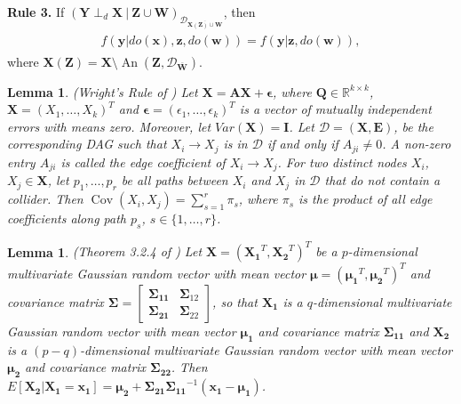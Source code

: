 \documentclass[twoside]{article}
\newtheorem{lemma}[theorem]{Lemma}
\DeclareMathOperator{\Cov}{Cov}
\DeclareMathOperator{\An}{An}
\newcommand\given[1][]{\:#1\vert\:}
\newcommand{\mb}[1]{\mathbf{#1}}
\newcommand{\dsepp}{\perp_{d}}
\newcommand{\g}[1][G]{\mathcal{#1}}
\begin{document}
\textbf{Rule 3.} If $(\mb{Y} \dsepp \mb{X} \given \mb{Z} \cup \mb{W})_{\g[D]_{\overline{\mb{X}(\mb{Z}) \cup \mb{W}}}}$, then
    \begin{align}
        \begin{split}
            f(\mb{y} | do(\mb{x}),\mb{z},do(\mb{w})) = f(\mb{y} | \mb{z},do(\mb{w})), \label{eq:rule3-do}
        \end{split}
    \end{align}
where $\mb{X(Z)} = \mb{X} \setminus \An(\mb{Z}, \g[D]_{\overline{\mb{W}}})$.


\begin{lemma}
\label{lem:wright}
{\normalfont (Wright's Rule of \citealp{wright1921correlation})}
    Let $\mb{X}=\mb{AX}+\mb{\epsilon}$, where $\mb{Q} \in \mathbb{R}^{k \times k}$, $\mb{X} = (X_1, \dots, X_k)^T$ and $\mb{\epsilon} = (\epsilon_1, \dots, \epsilon_k)^T$ is a vector of mutually independent errors with means zero. Moreover, let $Var(\mb{X}) = \mb{I}$. Let $\g[D] = (\mb{X}, \mb{E})$, be the corresponding DAG such that $X_i \to X_j$ is in $\g[D]$ if and only if $A_{ji} \neq 0$. A non-zero entry $A_{ji}$ is called the edge coefficient of $X_i \to X_j$. For two distinct nodes $X_i$, $X_j \in \mb{X}$, let $p_1, \dots, p_r$ be all paths between $X_i$ and $X_j$ in $\g[D]$ that do not contain a collider. Then $\Cov(X_i, X_j) = \sum_{s=1}^r \pi_s$, where $\pi_s$ is the product of all edge coefficients along path $p_s$, $s \in \{1, \dots, r\}$.
\end{lemma}


\begin{lemma}
\label{lem:mardia}
{\normalfont (Theorem 3.2.4 of \citealp{mardia1980multivariate})}
    Let $\mb{X} = (\mb{X_1}^T, \mb{X_2}^T)^T$ be a $p$-dimensional multivariate Gaussian random vector with mean vector $\mb{\mu} = (\mb{\mu_1}^T, \mb{\mu_2}^T)^T$ and covariance matrix $\mb{\Sigma} = \begin{bmatrix}
    \mb{\Sigma_{11}} & \mb{\Sigma}_{12} \\
    \mb{\Sigma_{21}} & \mb{\Sigma}_{22}
    \end{bmatrix}$, so that $\mb{X_1}$ is a $q$-dimensional multivariate Gaussian random vector with mean vector $\mb{\mu_1}$ and covariance matrix $\mb{\Sigma_{11}}$ and $\mb{X_2}$ is a $(p-q)$-dimensional multivariate Gaussian random vector with mean vector $\mb{\mu_2}$ and covariance matrix $\mb{\Sigma_{22}}$. Then $E[\mb{X_2}|\mb{X_1} = \mb{x_1}] = \mb{\mu_2} + \mb{\Sigma_{21}} \mb{\Sigma_{11}}^{-1}(\mb{x_1} - \mb{\mu_1})$.
\end{lemma}
\end{document}
